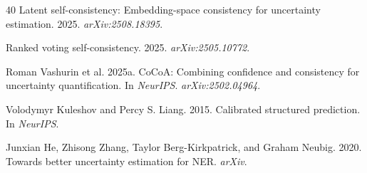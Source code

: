 \documentclass[11pt,a4paper]{article}
\begin{document}
\begin{thebibliography}{40}
Latent self-consistency: Embedding-space consistency for uncertainty estimation. 2025.
\emph{arXiv:2508.18395}.

Ranked voting self-consistency. 2025.
\emph{arXiv:2505.10772}.

Roman Vashurin et al. 2025a.
{CoCoA}: Combining confidence and consistency for uncertainty quantification.
In \emph{NeurIPS}. \emph{arXiv:2502.04964}.

Volodymyr Kuleshov and Percy S. Liang. 2015.
Calibrated structured prediction.
In \emph{NeurIPS}.

Junxian He, Zhisong Zhang, Taylor Berg-Kirkpatrick, and Graham Neubig. 2020.
Towards better uncertainty estimation for {NER}.
\emph{arXiv}.

\end{thebibliography}
\end{document}
